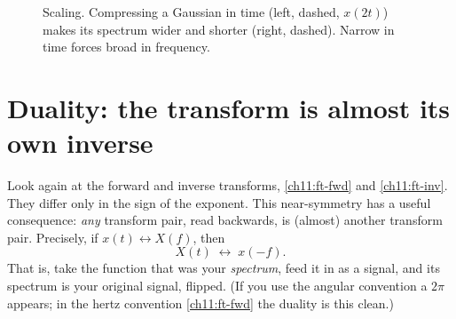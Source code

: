 \begin{figure}[H]
\centering
{}
\hfill
{}
\caption{Scaling. Compressing a Gaussian in time (left, dashed, $x(2t)$) makes
its spectrum wider and shorter (right, dashed). Narrow in time forces broad in
frequency.}
\label{ch11:fig-scaling}
\end{figure}

\section{Duality: the transform is almost its own inverse}
\label{ch11:duality}

Look again at the forward and inverse transforms,
\eqref{ch11:ft-fwd} and \eqref{ch11:ft-inv}. They differ only in the sign of the
exponent. This near-symmetry has a useful consequence: \emph{any} transform
pair, read backwards, is (almost) another transform pair. Precisely, if
$x(t) \longleftrightarrow X(f)$, then
\[
X(t) \;\longleftrightarrow\; x(-f).
\]
That is, take the function that was your \emph{spectrum}, feed it in as a signal,
and its spectrum is your original signal, flipped. (If you use the angular
convention a $2\pi$ appears; in the hertz convention \eqref{ch11:ft-fwd} the
duality is this clean.)

